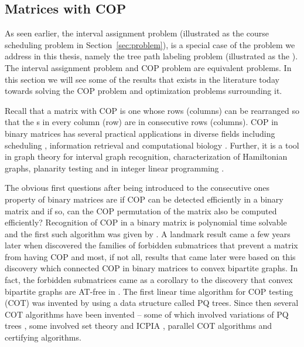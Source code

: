 {%
\color{blue}
\subsection{Matrices with COP}
\label{sec:copmatrices}
As seen earlier, the interval assignment problem (illustrated as the
course scheduling problem in Section~\ref{sec:problem}), is a special
case of the problem we address in this thesis, namely the tree path
labeling problem (illustrated as the \illustrationproblem). The
interval assignment problem and COP problem are equivalent
problems. In this section we will see some of the results that exists
in the literature today towards solving the COP problem and
optimization problems surrounding it.

Recall that a matrix with COP is one whose rows (columns) can be
rearranged so that the {\un}s in every column (row) are in consecutive
rows (columns). COP in binary matrices has several practical applications
in diverse fields including scheduling \cite{hl06}, information
retrieval \cite{k77} and computational biology \cite{abh98}.  Further,
it is a tool in graph theory \cite{mcg04} for interval graph
recognition, characterization of Hamiltonian graphs, planarity testing
\cite{bl76} and in integer linear programming \cite{ht02,hl06}.


The obvious first questions after being introduced to the consecutive
ones property of binary matrices are if COP can be detected
efficiently in a binary matrix and if so, can the COP permutation of
the matrix also be computed efficiently?  Recognition of COP in a
binary matrix is polynomial time solvable and the first such algorithm
was given by \cite{fg65}.  A landmark result came a few years later
when \cite{at72} discovered the families of forbidden submatrices that
prevent a matrix from having COP and most, if not all, results that
came later were based on this discovery which connected COP in binary
matrices to convex bipartite graphs. In fact, the forbidden
submatrices came as a corollary to the discovery that convex bipartite
graphs are AT-free in \cite{at72}. The first linear
time algorithm for COP testing (COT) was invented by \cite{bl76} using
a data structure called PQ trees.  Since then several COT algorithms
have been invented -- some of which involved variations of PQ trees
\cite{mm96,wlh01,mcc04}, some involved set theory and ICPIA
\cite{wlh02,nsnrs09}, parallel COT algorithms\cite{as95,bs03,ly91} and
certifying algorithms\cite{mcc04}.

}
